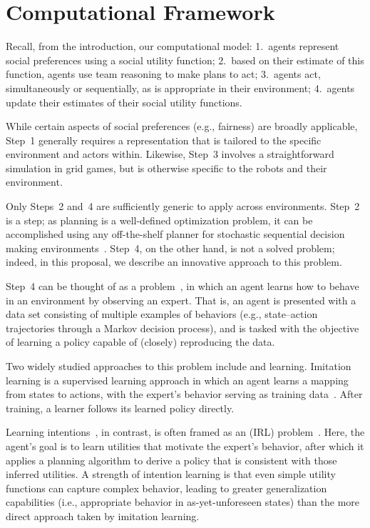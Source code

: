 
\section{Computational Framework}
\label{sec:process}

Recall, from the introduction, our computational model:
1.~agents represent social preferences using a social utility function;
2.~based on their estimate of this function, agents use team reasoning to make plans to act;
3.~agents act, simultaneously or sequentially, as is appropriate in their environment;
4.~agents update their estimates of their social utility functions.

While certain aspects of social preferences (e.g., fairness) are broadly applicable,
Step~1 generally requires a representation that is tailored to the specific environment and actors within.
Likewise, Step~3 involves a straightforward simulation in grid games, but is
otherwise specific to the robots and their environment.

Only Steps~2 and~4 are sufficiently generic to apply across
environments.  Step~2 is a  step; as planning is
a well-defined optimization problem,
it can be accomplished using any off-the-shelf planner for
stochastic sequential decision making
environments~\cite{Barto95,bellman57,boutilier99,collins95,kearns99b,kocsis06}.
%
Step~4, on the other hand, is not a solved problem; indeed, in this
proposal,
we describe an innovative approach to this problem.

Step~4 can be thought of as a 
problem~\cite{argall09}, in which an agent learns how to behave in an
environment by observing an expert.  That is, an agent is presented
with a data set consisting of multiple examples of behaviors (e.g.,
state--action trajectories through a Markov decision process), and is
tasked with the objective of learning a policy capable of (closely)
reproducing the data.

Two widely studied approaches to this problem include
 and  learning.  Imitation learning
is a supervised learning approach in which an agent learns a mapping
from states to actions, with the expert's behavior serving as training
data~\cite{pomerleau93}.  After training, a learner follows its
learned policy directly.

Learning intentions~\cite{macglashan15b}, in contrast, is often framed
as an  (IRL)
problem~\cite{babes11,ng00}.  Here, the agent's goal is to learn
utilities that motivate the expert's behavior, after which it applies a
planning algorithm to derive a policy that is consistent with those
inferred utilities.  A strength of intention learning is that even simple
utility functions can capture complex behavior, leading to greater
generalization capabilities (i.e., appropriate behavior in
as-yet-unforeseen states) than the more direct approach taken by
imitation learning.

